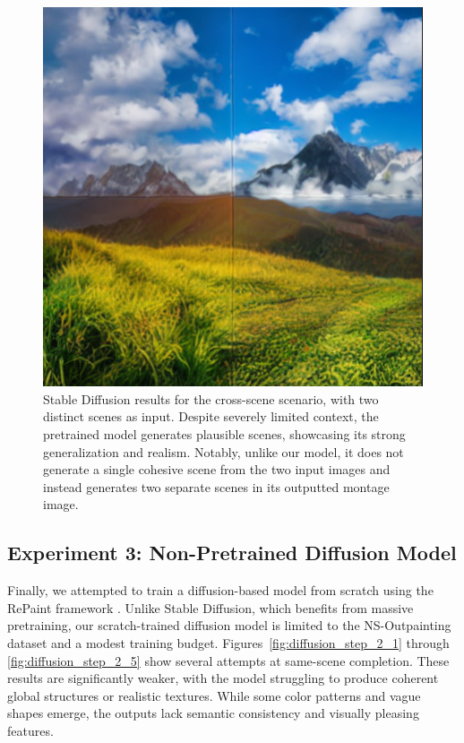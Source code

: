 \documentclass[sigconf]{acmart}
\begin{document}
\begin{figure}[h!]
    \centering
    \includegraphics[width=\linewidth]{stable_diffusion_step_5}
    \caption{Stable Diffusion results for the cross-scene scenario, with two distinct scenes as input. Despite severely limited context, the pretrained model generates plausible scenes, showcasing its strong generalization and realism. Notably, unlike our model, it does not generate a single cohesive scene from the two input images and instead generates two separate scenes in its outputted montage image.}
    \label{fig:stable_diffusion_step_5}
\end{figure}

\subsection*{Experiment 3: Non-Pretrained Diffusion Model}

Finally, we attempted to train a diffusion-based model from scratch using the RePaint framework \cite{Lugmayr2022}. Unlike Stable Diffusion, which benefits from massive pretraining, our scratch-trained diffusion model is limited to the NS-Outpainting dataset and a modest training budget. Figures~\ref{fig:diffusion_step_2_1} through \ref{fig:diffusion_step_2_5} show several attempts at same-scene completion. These results are significantly weaker, with the model struggling to produce coherent global structures or realistic textures. While some color patterns and vague shapes emerge, the outputs lack semantic consistency and visually pleasing features.
\end{document}
